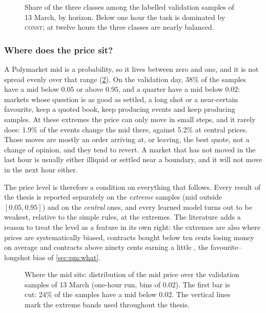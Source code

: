 \begin{figure}[t]
\centering

\caption{Share of the three classes among the labelled validation samples of 13 March, by
horizon.  Below one hour the task is dominated by \textsc{const}; at twelve hours the
three classes are nearly balanced.}
\label{fig:expl:classes}
\end{figure}

\subsubsection{Where does the price sit?}
\label{sec:expl:level}

A Polymarket mid is a probability, so it lives between zero and one, and it is not spread
evenly over that range (\cref{fig:expl:midhist}).  On the validation day, 38\% of the
samples have a mid below $0.05$ or above $0.95$, and a quarter have a mid below $0.02$:
markets whose question is as good as settled, a long shot or a near-certain favourite,
keep a quoted book, keep producing events and keep producing samples.  At these extremes
the price can only move in small steps, and it rarely does: 1.9\% of the events change the
mid there, against 5.2\% at central prices.  Those moves are mostly an order arriving at,
or leaving, the best quote, not a change of opinion, and they tend to revert.  A market
that has not moved in the last hour is usually either illiquid or settled near a
boundary, and it will not move in the next hour either.

The price level is therefore a condition on everything that follows.  Every result of the
thesis is reported separately on the \emph{extreme} samples (mid outside $[0.05, 0.95]$)
and on the \emph{central} ones, and every learned model turns out to be weakest, relative
to the simple rules, at the extremes.  The literature adds a reason to treat the level as a
feature in its own right: the extremes are also where prices are systematically biased,
contracts bought below ten cents losing money on average and contracts above ninety cents
earning a little \cite{cardozo2026favorite}, the favourite--longshot bias of
\cref{sec:pm:what}.

\begin{figure}[t]
\centering

\caption{Where the mid sits: distribution of the mid price over the validation samples of
13 March (one-hour run, bins of $0.02$).  The first bar is cut: 24\% of the samples have a
mid below $0.02$.  The vertical lines mark the extreme bands used throughout the thesis.}
\label{fig:expl:midhist}
\end{figure}


